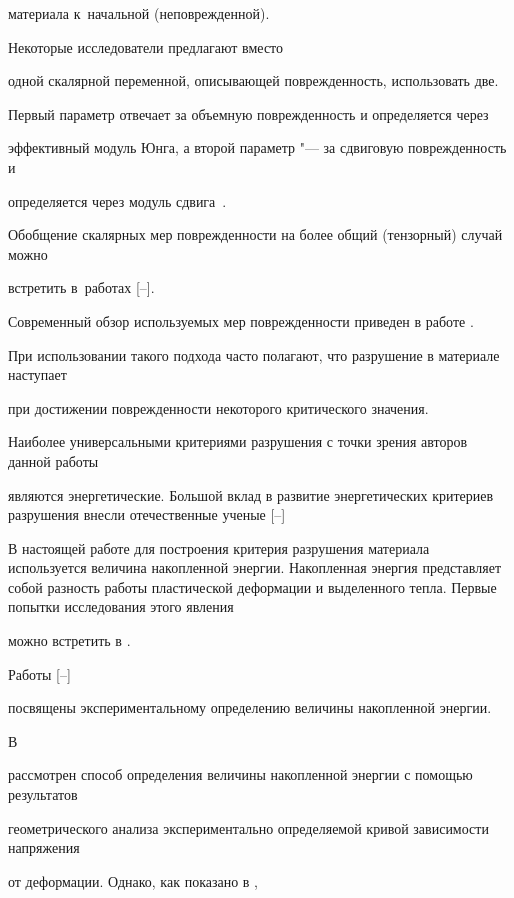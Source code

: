 материала к~начальной (неповрежденной). 

Некоторые исследователи предлагают вместо

одной скалярной переменной, описывающей поврежденность, использовать две.

Первый параметр отвечает за объемную поврежденность и определяется через

эффективный модуль Юнга, а второй параметр "--- за сдвиговую поврежденность и

определяется через модуль сдвига~\cite{kostina:bib:TangSheng}.

Обобщение скалярных мер поврежденности на более общий (тензорный) случай можно

встретить в~работах [--].

Современный обзор используемых мер поврежденности приведен в работе \cite{kostina:bib:StepIgonin}.

При использовании такого подхода часто полагают, что разрушение в материале наступает

при достижении поврежденности некоторого критического значения.



Наиболее универсальными критериями разрушения с точки зрения авторов данной работы

являются энергетические. Большой вклад в развитие энергетических критериев разрушения внесли отечественные ученые [--]

В настоящей работе для построения критерия разрушения материала используется величина накопленной энергии. Накопленная энергия представляет собой разность работы пластической деформации и выделенного тепла. Первые попытки исследования этого явления

можно встретить в \cite{kostina:bib:FarrenTaylor,kostina:bib:TaylorQuin}.

Работы  [--]

посвящены экспериментальному определению величины накопленной энергии.

В \cite{kostina:bib:AravasKim}

рассмотрен способ определения величины накопленной энергии с помощью результатов

геометрического анализа экспериментально определяемой кривой зависимости напряжения

от деформации. Однако, как показано в  \cite{kostina:bib:OliferukMaj},


